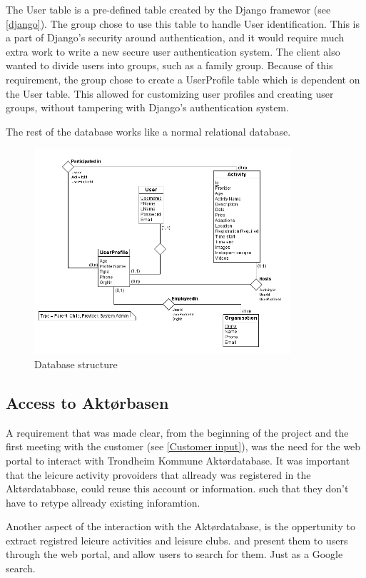 The User table is a pre-defined table created by the Django framewor (see \ref{django}). The group chose to use this table to handle User identification. This is a part of Django's security around authentication, and it would require much extra work to write a new secure user authentication system. The client also wanted to divide users into groups, such as a family group. Because of this requirement, the group chose to create a UserProfile table which is dependent on the User table. This allowed for customizing user profiles and creating user groups, without tampering with Django's authentication system. 

The rest of the database works like a normal relational database.

\begin{figure}[h!]
\centering
    \includegraphics[width=0.85\textwidth]{fig/database_diagram}
\caption{Database structure}
\label{Database_Figure}
\end{figure}


\subsection{Access to Aktørbasen}
A requirement that was made clear, from the beginning of the project and the first meeting with the customer (see \ref{Customer input}), was the need for the web portal to interact with Trondheim Kommune Aktørdatabase. It was important that the leicure activity provoiders that allready was registered in the Aktørdatabbase, could reuse this account or information. such that they don't have to retype allready existing inforamtion. 

Another aspect of the interaction with the Aktørdatabase, is the oppertunity to extract registred leicure activities and leisure clubs. and present them to users through the web portal, and allow users to search for them. Just as a Google search. 

